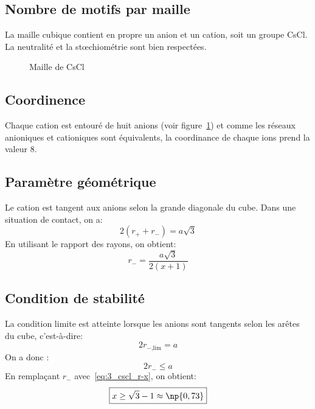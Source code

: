 \subsection{Nombre de motifs par maille}
La maille cubique contient en propre un anion et un cation, soit un groupe CsCl.
La neutralité et la st\oe chiométrie sont bien respectées.
\begin{figure}
    \centering
    \qquad
    \qquad
    \caption{Maille de CsCl}\label{fig:3_cscl_maille}
\end{figure}

\subsection{Coordinence}
Chaque cation est entouré de huit anions (voir figure~\ref{fig:3_cscl_maille})
et comme les réseaux anioniques et cationiques sont équivalents, la coordinance
de chaque ions prend la valeur 8.


\subsection{Paramètre géométrique}
Le cation est tangent aux anions selon la grande diagonale du cube. Dans une
situation de contact, on a:
\begin{equation}
    2(r_+ + r_-) = a\sqrt{3}
    \label{eq:3_cscl_ar+r-}
\end{equation}
En utilisant le rapport des rayons, on obtient:
\begin{equation}
    r_- = \frac{a\sqrt{3}}{2(x + 1)}
    \label{eq:3_cscl_r-x}
\end{equation}


\subsection{Condition de stabilité}
La condition limite est atteinte lorsque les anions sont tangents selon les arêtes
du cube, c'est-à-dire:
\begin{equation}
    2r_{-\text{,lim}} = a
\end{equation}
On a donc :
\begin{equation}
    2r_- \leq a
\end{equation}
En remplaçant $r_-$ avec~\ref{eq:3_cscl_r-x}, on obtient:
\begin{equation}
    \boxed{x \geq \sqrt{3} - 1 \approx \np{0,73}}
\end{equation}

